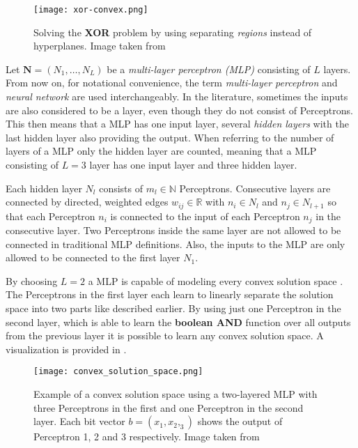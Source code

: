 \begin{figure}[htb!]
    \centering
    \texttt{[image: xor-convex.png]}
    \caption{Solving the \textbf{XOR} problem by using separating \textit{regions} instead of hyperplanes. Image taken from \cite{rojas_neural_1996}}
    \label{fig:xor-convex}
\end{figure}

Let $\bm{N} = (N_1, \dots, N_L)$ be a \textit{multi-layer perceptron (MLP)} consisting of $L$ layers.
From now on, for notational convenience, the term \textit{multi-layer perceptron} and \textit{neural network} are used interchangeably.
In the literature, sometimes the inputs are also considered to be a layer, even though they do not consist of Perceptrons.
This then means that a MLP has one input layer, several \textit{hidden layers} with the last hidden layer also providing the output.
When referring to the number of layers of a MLP only the hidden layer are counted, meaning that a MLP consisting of $L=3$ layer has one input layer and three hidden layer.

Each hidden layer $N_l$ consists of $m_l \in \mathbb{N}$ Perceptrons.
Consecutive layers are connected by directed, weighted edges $w_{ij} \in \mathbb{R}$ with $n_i \in N_l$ and $n_j \in N_{l+1}$ so that each Perceptron $n_i$ is connected to the input of each Perceptron $n_j$ in the consecutive layer.
Two Perceptrons inside the same layer are not allowed to be connected in traditional MLP definitions.
Also, the inputs to the MLP are only allowed to be connected to the first layer $N_1$.

By choosing $L=2$ a MLP is capable of modeling every convex solution space \cite{rojas_neural_1996}.
The Perceptrons in the first layer each learn to linearly separate the solution space into two parts like described earlier.
By using just one Perceptron in the second layer, which is able to learn the \textbf{boolean AND} function over all outputs from the previous layer it is possible to learn any convex solution space.
A visualization is provided in .

\begin{figure}[htb!]
    \centering
    \texttt{[image: convex\_solution\_space.png]}
    \caption{Example of a convex solution space using a two-layered MLP with three Perceptrons in the first and one Perceptron in the second layer. Each bit vector $b = (x_1, x_2, _3)$ shows the output of Perceptron 1, 2 and 3 respectively. Image taken from \cite{rojas_neural_1996}}
    \label{fig:convex-solution}
\end{figure}

